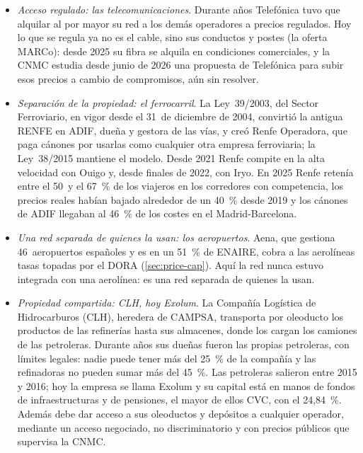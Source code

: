 \documentclass[11pt]{article}
\begin{document}
\begin{itemize}
\item \emph{Acceso regulado: las telecomunicaciones}. Durante años Telefónica tuvo que alquilar al por mayor su red a los demás operadores a precios regulados. Hoy lo que se regula ya no es el cable, sino sus conductos y postes (la oferta MARCo): desde 2025 su fibra se alquila en condiciones comerciales\nocite{CNMC2025Desregulacion}, y la CNMC estudia desde junio de 2026 una propuesta de Telefónica para subir esos precios a cambio de compromisos, aún sin resolver\nocite{CNMC2026CompromisosTelefonica}.
\item \emph{Separación de la propiedad: el ferrocarril}. La Ley~39/2003, del Sector Ferroviario, en vigor desde el 31~de diciembre de 2004, convirtió la antigua RENFE en ADIF, dueña y gestora de las vías, y creó Renfe Operadora, que paga cánones por usarlas como cualquier otra empresa ferroviaria\nocite{BOE2003LSF,BOE2004RDL1}; la Ley~38/2015 mantiene el modelo\nocite{BOE2015LSF}. Desde 2021 Renfe compite en la alta velocidad con Ouigo y, desde finales de 2022, con Iryo\nocite{CNMC2025BalanceLiberalizacion}. En 2025 Renfe retenía entre el 50~y el 67~\% de los viajeros en los corredores con competencia, los precios reales habían bajado alrededor de un 40~\% desde 2019 y los cánones de ADIF llegaban al 46~\% de los costes en el Madrid-Barcelona\nocite{CNMC2026InformeFerroviario2025}.
  \item \emph{Una red separada de quienes la usan: los aeropuertos}. Aena, que gestiona 46~aeropuertos españoles y es en un 51~\% de ENAIRE\nocite{ENAIRE2025PlanActuacion2026}, cobra a las aerolíneas tasas topadas por el DORA\nocite{BOE2026DORA} (\ref{sec:price-cap}). Aquí la red nunca estuvo integrada con una aerolínea: es una red separada de quienes la usan.
\item \emph{Propiedad compartida: CLH, hoy Exolum}. La Compañía Logística de Hidrocarburos (CLH), heredera de CAMPSA, transporta por oleoducto los productos de las refinerías hasta sus almacenes, donde los cargan los camiones de las petroleras. Durante años sus dueñas fueron las propias petroleras, con límites legales: nadie puede tener más del 25~\% de la compañía y las refinadoras no pueden sumar más del 45~\%\nocite{BOE2000RDL6}. Las petroleras salieron entre 2015 y 2016\nocite{Alimarket2016BP}; hoy la empresa se llama Exolum\nocite{Exolum2026Historia} y su capital está en manos de fondos de infraestructuras y de pensiones, el mayor de ellos CVC, con el 24,84~\%\nocite{Exolum2026Capital}. Además debe dar acceso a sus oleoductos y depósitos a cualquier operador, mediante un acceso negociado, no discriminatorio y con precios públicos que supervisa la CNMC\nocite{BOE1998LH}.
\end{itemize}
\end{document}
